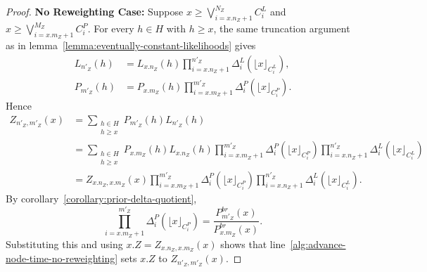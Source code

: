 \begin{proof}
    \textbf{No Reweighting Case:} Suppose
    $x \geq \bigvee_{i=x.n_Z+1}^{N_Z} C^L_i$ and $x \geq \bigvee_{i=x.m_Z+1}^{M_Z} C^P_i$.
    For every $h \in H$ with $h \geq x$, the same truncation argument as in
    lemma~\ref{lemma:eventually-constant-likelihoods} gives
    \begin{align*}
    L_{n'_Z}(h)
    &= L_{x.n_Z}(h)\prod_{i=x.n_Z+1}^{n'_Z} \Delta^L_i(\lfloor x \rfloor_{C^L_i}), \\
    P_{m'_Z}(h)
    &= P_{x.m_Z}(h)\prod_{i=x.m_Z+1}^{m'_Z} \Delta^P_i(\lfloor x \rfloor_{C^P_i}).
    \end{align*}
    Hence
    \begin{align*}
    Z_{n'_Z,m'_Z}(x)
    &= \sum_{\substack{h \in H \\ h \geq x}} P_{m'_Z}(h)L_{n'_Z}(h) \\
    &= \sum_{\substack{h \in H \\ h \geq x}}
    P_{x.m_Z}(h)L_{x.n_Z}(h)
    \prod_{i=x.m_Z+1}^{m'_Z} \Delta^P_i(\lfloor x \rfloor_{C^P_i})
    \prod_{i=x.n_Z+1}^{n'_Z} \Delta^L_i(\lfloor x \rfloor_{C^L_i}) \\
    &= Z_{x.n_Z,x.m_Z}(x)
    \prod_{i=x.m_Z+1}^{m'_Z} \Delta^P_i(\lfloor x \rfloor_{C^P_i})
    \prod_{i=x.n_Z+1}^{n'_Z} \Delta^L_i(\lfloor x \rfloor_{C^L_i}).
    \end{align*}
    By corollary~\ref{corollary:prior-delta-quotient},
    $$
    \prod_{i=x.m_Z+1}^{m'_Z} \Delta^P_i(\lfloor x \rfloor_{C^P_i})
    =
    \frac{P^{br}_{m'_Z}(x)}{P^{br}_{x.m_Z}(x)}.
    $$
    Substituting this and using $x.Z = Z_{x.n_Z,x.m_Z}(x)$ shows that
    line~\ref{alg:advance-node-time-no-reweighting} sets
    $x.Z$ to $Z_{n'_Z,m'_Z}(x)$.
\end{proof}


